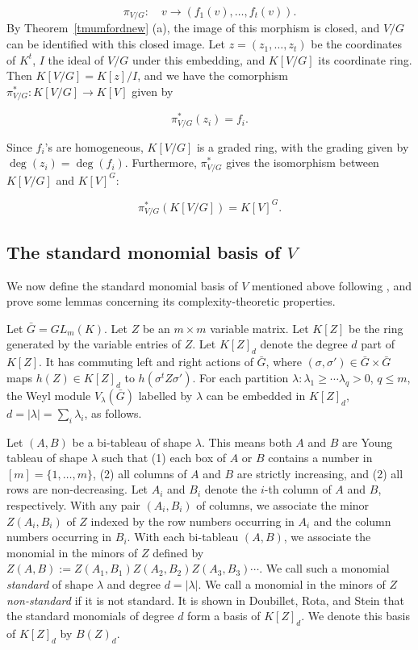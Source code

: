 \documentclass[11pt]{article}
\begin{document}
\begin{equation} \label{eqmorphismhilbert}
\pi_{V/G}: \quad  v \rightarrow (f_1(v),\ldots,f_t(v)).
\end{equation}
By Theorem~\ref{tmumfordnew} (a), the image of this morphism  is closed, and 
$V/G$ can be identified with this closed image.
Let $z=(z_1,\ldots,z_t)$ be the coordinates of $K^t$,  $I$ 
the ideal of $V/G$ under this embedding, and $K[V/G]$ its coordinate ring. 
Then $K[V/G]=K[z]/I$, and we have the comorphism $\pi_{V/G}^*: K[V/G] \rightarrow K[V]$ given by 

\begin{equation}\label{eqmorphism2new}
 \pi_{V/G}^*(z_i)=f_i. 
\end{equation}

Since $f_i$'s are homogeneous, $K[V/G]$ is a graded ring, with the grading given by $\deg(z_i)=\deg(f_i)$.
Furthermore, $\pi_{V/G}^*$ gives the isomorphism between $K[V/G]$ and $K[V]^G$:

\[\pi_{V/G}^*(K[V/G])=K[V]^G. \]

\subsection{The standard monomial  basis of $V$} \label{sstandard}
We now define the standard monomial basis of $V$ mentioned above   following 
\cite{raghavan}, and prove some lemmas concerning its complexity-theoretic properties.

Let $\bar G=GL_m(K)$. 
Let $Z$ be an  $m\times m$ variable matrix. Let $K[Z]$ be the ring generated by the variable entries of
$Z$. Let $K[Z]_d$ denote the degree $d$ part of $K[Z]$. 
It has commuting left and right actions of $\bar G$, where $(\sigma,\sigma') \in \bar G \times \bar G$
maps $h(Z) \in K[Z]_d$ to $h(\sigma^{t} Z \sigma')$.
For each partition $\lambda: \lambda_1 \ge \cdots \lambda_q >0$, $q\le m$, the Weyl module $V_\lambda(\bar G)$
labelled by $\lambda$ can be embedded in $K[Z]_d$, $d=|\lambda|=\sum_i \lambda_i$, as follows.

Let $(A,B)$ be a bi-tableau of shape $\lambda$. This means both $A$ and $B$ are Young tableau
\cite{fultonrepr} of
shape $\lambda$ such that (1) each box of $A$ or $B$ contains a number in $[m]=\{1,\ldots,m\}$, (2)
all columns of $A$ and $B$ are strictly increasing, and (2) all rows are non-decreasing.  
Let $A_i$ and $B_i$ denote the $i$-th column of $A$ and $B$, respectively. With any pair $(A_i,B_i)$ of
columns, we associate the minor $Z(A_i,B_i)$ of $Z$ indexed by the row numbers occurring in $A_i$ and the column numbers
occurring in $B_i$. With each bi-tableau $(A,B)$, we associate the monomial in the minors of $Z$ defined 
by $Z(A,B):=Z(A_1,B_1) Z(A_2,B_2) Z(A_3, B_3)  \cdots $. We call such a monomial {\em standard} of shape $\lambda$ and 
degree $d=|\lambda|$. We call a monomial in the minors of $Z$ {\em non-standard} if it is not standard.
It is shown in Doubillet, Rota, and Stein \cite{doubillet} that the standard monomials of degree $d$ form a basis of $K[Z]_d$. We denote this basis of $K[Z]_d$  by {\em $B(Z)_d$}.
\end{document}
